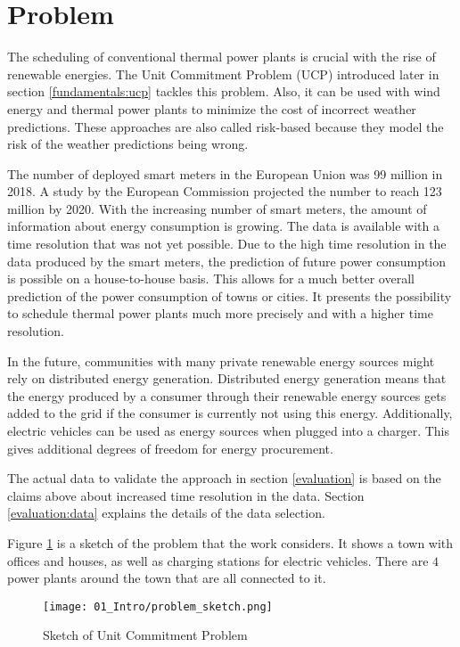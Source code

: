 \section{Problem}

The scheduling of conventional thermal power plants is crucial with the rise of renewable energies.
The Unit Commitment Problem (UCP) introduced later in section \ref{fundamentals:ucp} tackles this problem.
\cite{Banos2011}
Also, it can be used with wind energy and thermal power plants to minimize the cost of incorrect weather predictions.
These approaches are also called risk-based because they model the risk of the weather predictions being wrong.
\cite{Chen2008,Abujarad2017}

The number of deployed smart meters in the European Union was 99 million in 2018.
A study by the European Commission projected the number to reach 123 million by 2020.
\cite{Vlachogiannis2019}
With the increasing number of smart meters, the amount of information about energy consumption is growing.
The data is available with a time resolution that was not yet possible.
Due to the high time resolution in the data produced by the smart meters,
the prediction of future power consumption is possible on a house-to-house basis.
This allows for a much better overall prediction of the power consumption of towns or cities.
\cite{Aiello2016, Basu2013}
It presents the possibility to schedule thermal power plants much more precisely
and with a higher time resolution.

In the future, communities with many private renewable energy sources might rely on distributed energy generation.
Distributed energy generation means that the energy produced by a consumer through their renewable energy sources gets added to the grid if the consumer is currently not using this energy.
Additionally, electric vehicles can be used as energy sources when plugged into a charger.
This gives additional degrees of freedom for energy procurement.
\cite{Aiello2016, Zhang2016}

The actual data to validate the approach in section \ref{evaluation} is based on the claims above about increased time resolution in the data.
Section \ref{evaluation:data} explains the details of the data selection.

Figure \ref{figure:problem.sketch} is a sketch of the problem that the work considers.
It shows a town with offices and houses, as well as charging stations for electric vehicles.
There are $4$ power plants around the town that are all connected to it.

\begin{figure}
  \centering
  \texttt{[image: 01\_Intro/problem\_sketch.png]}
  \caption{Sketch of Unit Commitment Problem}
  \label{figure:problem.sketch}
\end{figure}
